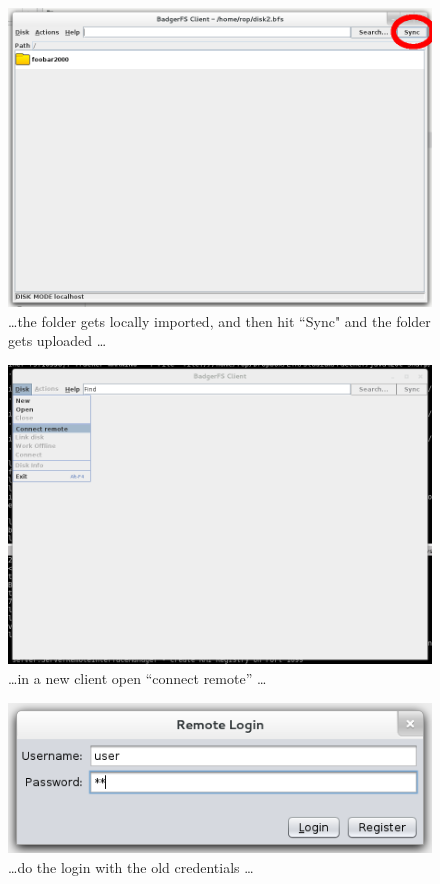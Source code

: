 \begin{figure}[h!]
\centering
\includegraphics[width=1\textwidth]{figures/serverUseCase/07_sync.png}
\caption{\ldots the folder gets locally imported, and then hit ``Sync" and the
folder gets uploaded \ldots}\label{fig:07_sync.png}
\end{figure}

\begin{figure}[h!]
\centering
\includegraphics[width=1\textwidth]{figures/serverUseCase/08_new_client_connect_remote.png}
\caption{\ldots in a new client open ``connect remote''
\ldots}\label{fig:08_new_client_connect_remote.png}
\end{figure}


\begin{figure}[h!]
\centering
\includegraphics[width=1\textwidth]{figures/serverUseCase/09_login.png}
\caption{\ldots do the login with the old credentials \ldots}
\label{fig:09_login.png}
\end{figure}

